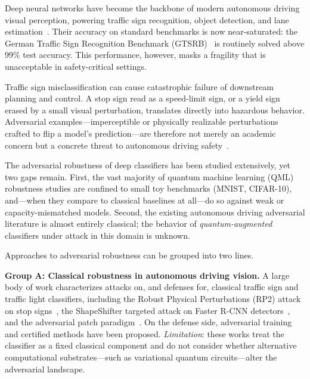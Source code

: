 \documentclass[11pt]{article}
\begin{document}
Deep neural networks have become the backbone of modern autonomous driving
visual perception, powering traffic sign recognition, object detection, and
lane estimation~\cite{bojarski2016nvidia,grigorescu2020autonomous_survey}.
Their accuracy on standard benchmarks is now near-saturated: the German
Traffic Sign Recognition Benchmark (GTSRB)~\cite{stallkamp2012gtsrb} is
routinely solved above 99\% test accuracy. This performance, however,
masks a fragility that is unacceptable in safety-critical settings.

Traffic sign misclassification can cause catastrophic failure of downstream
planning and control. A stop sign read as a speed-limit sign, or a
yield sign erased by a small visual perturbation, translates directly into
hazardous behavior. Adversarial examples---imperceptible or physically
realizable perturbations crafted to flip a model's prediction---are therefore
not merely an academic concern but a concrete threat to autonomous driving
safety~\cite{eykholt2018rp2,chen2018shapeshifter}.

The adversarial robustness of deep classifiers has been studied extensively,
yet two gaps remain. First, the vast majority of quantum machine learning
(QML) robustness studies are confined to small toy benchmarks (MNIST,
CIFAR-10), and---when they compare to classical baselines at all---do so
against weak or capacity-mismatched models. Second, the existing autonomous
driving adversarial literature is almost entirely classical; the behavior of
\emph{quantum-augmented} classifiers under attack in this domain is unknown.

Approaches to adversarial robustness can be grouped into two lines.

\textbf{Group A: Classical robustness in autonomous driving vision.}
A large body of work characterizes attacks on, and defenses for, classical
traffic sign and traffic light classifiers, including the Robust Physical
Perturbations (RP2) attack on stop signs~\cite{eykholt2018rp2}, the
ShapeShifter targeted attack on Faster R-CNN detectors~\cite{chen2018shapeshifter},
and the adversarial patch paradigm~\cite{brown2017adversarialpatch}. On the
defense side, adversarial training~\cite{madry2018pgd} and certified
methods have been proposed. \emph{Limitation}: these works treat the
classifier as a fixed classical component and do not consider whether
alternative computational substrates---such as variational quantum
circuits---alter the adversarial landscape.
\end{document}
